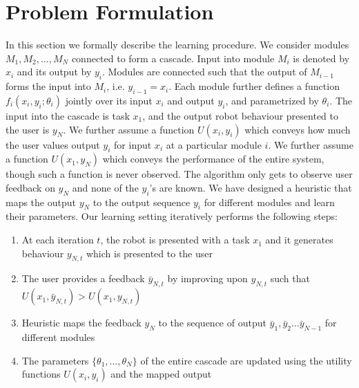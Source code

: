 \section{Problem Formulation}
In this section we formally describe the learning procedure. We consider modules $M_1,M_2,...,M_N$ connected to form a cascade. Input into  module $M_i$ is denoted by $x_i$ and its output by $y_i$.  Modules are connected such that the output of $M_{i-1}$ forms the input into $M_i$, i.e. $y_{i-1} = x_i$. Each module further defines a function $f_i(x_i,y_i;\theta_i)$ jointly over its input $x_i$ and output $y_i$, and parametrized by $\theta_i$. The input into the cascade is task $x_1$, and the output robot behaviour presented to the user is $y_N$. 	We further assume a function $U(x_{i},y_{i})$ which conveys how much the user values output $y_{i}$ for input $x_{i}$ at a particular module $i$. We further assume a function $U(x_1,y_N)$ which conveys the performance of the entire system, though such a function is never observed. The algorithm only gets to observe user feedback on $y_N$ and none of the $y_{i}$'s are known. We have designed a heuristic that maps the output $y_{N}$ to the output sequence $y_{i}$ for different modules and learn their parameters. Our learning setting iteratively performs the following steps:
\begin{enumerate}
\item At each iteration $t$, the robot is presented with a task $x_1$ and it generates behaviour $y_{N,t}$ which is presented to the user
\item The user provides a feedback $\bar{y}_{N,t}$ by improving upon ${y}_{N,t}$ such that $U(x_1,\bar{y}_{N,t}) > U(x_1,{y}_{N,t})$
\item Heuristic maps the feedback $y_{N}$ to the sequence of output $\bar{y}_{1}, \bar{y}_{2} \dots \bar{y}_{N-1}$ for different modules
\item The parameters $\{\theta_1,...,\theta_N\}$ of the entire cascade are updated using the utility functions $U(x_{i},y_{i})$ and the mapped output
\end{enumerate} 

